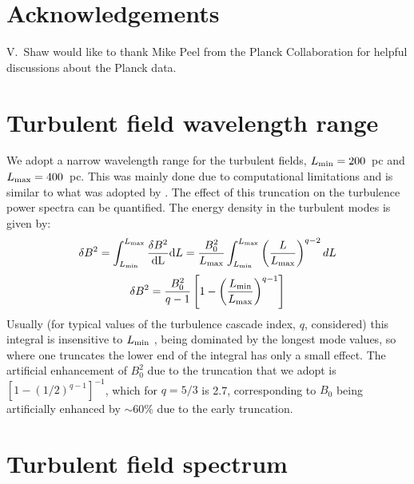 \documentclass[usenatbib]{mnras}
\begin{document}
\section*{Acknowledgements}
V.~Shaw would like to thank Mike Peel from the Planck Collaboration for helpful discussions about the Planck data.




\appendix

\section{Turbulent field wavelength range}

\label{Appendix_A}
We adopt a narrow wavelength range for the turbulent fields, $L_{\rm min}=200$~pc and $L_{\rm max}=400$~pc. This was mainly done due to computational limitations and is similar to what was adopted by \cite{West_Helicity}. The effect of this truncation on the turbulence power spectra can be quantified. The energy density in the turbulent modes is given by:
\begin{equation}
    \delta B^{2} = \int _{L_{\rm min}}^{L_{\rm max}} \frac{\delta B^{2}}{\rm{d}L}{\rm{d}}L = \frac{B_{0}^{2}}{L_{\rm max}}\int  _{L_{\rm min}}^{L_{\rm max}}\left(\frac{L}{L_{\rm max}}\right)^{q-2} dL
\end{equation}
\begin{equation}
  \delta B^{2}  =\frac{B_{0}^{2}}{q-1}\left[1-\left(\frac{L_{\rm min}}{L_{\rm max}}\right)^{q-1}\right] 
\end{equation}
Usually (for typical values of the turbulence cascade index, $q$,
considered) this integral is insensitive to $L_{\rm min}$ , being dominated by the longest mode values, so where one truncates the lower end of the integral has only a small effect. The artificial enhancement of $B_0^2$ due to the truncation that we adopt is $\left[1-(1/2)^{q-1}\right]^{-1}$, which for $q=5/3$ is 2.7, corresponding to $B_0$ being artificially enhanced by $\sim $60\% due to the early truncation.


\section{Turbulent field spectrum}
\end{document}
